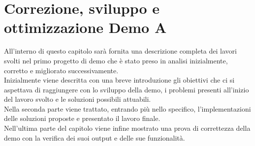 \chapter{Correzione, sviluppo e ottimizzazione Demo A} \label{ch:DemoA}

All'interno di questo capitolo sarà fornita una descrizione completa dei lavori svolti nel primo progetto di demo che è stato preso in analisi inizialmente, corretto e migliorato successivamente.
\\ Inizialmente viene descritta con una breve introduzione gli obiettivi che ci si aspettava di raggiungere con lo sviluppo della demo, i problemi presenti all'inizio del lavoro svolto e le soluzioni possibili attuabili.
\\ Nella seconda parte viene trattato, entrando più nello specifico, l'implementazioni delle soluzioni proposte e presentato il lavoro finale. 
\\ Nell'ultima parte del capitolo viene infine mostrato una prova di correttezza della demo con la verifica dei suoi output e delle sue funzionalità.


